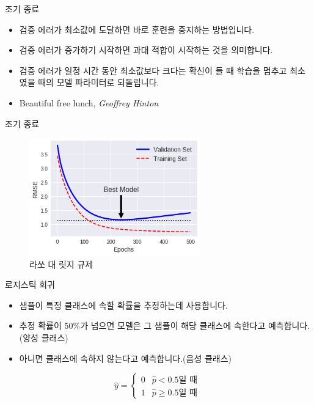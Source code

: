 \documentclass{beamer}
\numberwithin{equation}{section}
\begin{document}
\begin{frame}{조기 종료}

\begin{itemize}
\item 검증 에러가 최소값에 도달하면 바로 훈련을 중지하는 방법입니다.
\vskip 0.25cm
\item 검증 에러가 증가하기 시작하면 과대 적합이 시작하는 것을 의미합니다.
\vskip 0.25cm
\item 검증 에러가 일정 시간 동안 최소값보다 크다는 확신이 들 때 학습을 멈추고 최소였을 때의 모델 파라미터로 되돌립니다.
\vskip 0.25cm
\item Beautiful free lunch, \emph{Geoffrey Hinton}
\end{itemize}

\end{frame}


\begin{frame}{조기 종료}

\begin{figure}
\includegraphics[width=20em]{./images/early_stopping}
\caption{\label{fig:early_stopping}라쏘 대 릿지 규제}
\end{figure}

\end{frame}


\begin{frame}{로지스틱 회귀}

\begin{itemize}
\item 샘플이 특정 클래스에 속할 확률을 추정하는데 사용합니다.
\vskip 0.25cm
\item 추정 확률이 50\%가 넘으면 모델은 그 샘플이 해당 클래스에 속한다고 예측합니다.(양성 클래스)
\vskip 0.25cm
\item 아니면 클래스에 속하지 않는다고 예측합니다.(음성 클래스)
\end{itemize}

\vskip 0.25cm

\begin{equation}
\hat{y} =
\begin{cases}
    0 & \hat{p} < 0.5 \text{일 때 } \\
    1 & \hat{p} \geq 0.5 \text{일 때 } 
\end{cases}
\end{equation}

\end{frame}
    
\end{document}
